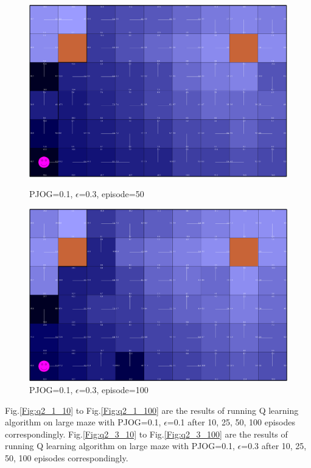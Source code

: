 \documentclass[11pt]{article}
\begin{document}
\begin{figure}[!htb]
   \begin{minipage}{0.4\textwidth}
     \centering
     \includegraphics[width=1.2\linewidth]{../figures/q1_3_50.png}
     \caption{PJOG=0.1, $\epsilon$=0.3, episode=50}\label{Fig:q1_3_50}
   \end{minipage}\hfill
   \begin{minipage}{0.4\textwidth}
     \centering
     \includegraphics[width=1.2\linewidth]{../figures/q1_3_100.png}
     \caption{PJOG=0.1, $\epsilon$=0.3, episode=100}\label{Fig:q1_3_100}
   \end{minipage}
\end{figure}

Fig.\ref{Fig:q2_1_10} to Fig.\ref{Fig:q2_1_100} are the results of running Q learning algorithm on large maze with PJOG=0.1, $\epsilon$=0.1 after 10, 25, 50, 100 episodes correspondingly. Fig.\ref{Fig:q2_3_10} to Fig.\ref{Fig:q2_3_100} are the results of running Q learning algorithm on large maze with PJOG=0.1, $\epsilon$=0.3 after 10, 25, 50, 100 episodes correspondingly. \\
\end{document}
